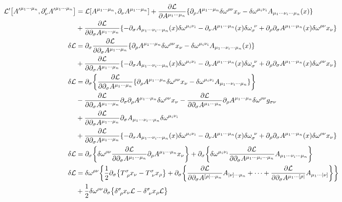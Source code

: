\documentclass[twoside]{amsart}
\numberwithin{equation}{section}
\begin{document}
\begin{align}
    \mathcal L'\qty[{A'}^{\mu_1\cdots\mu_n},\partial_\nu' {A'}^{\mu_1\cdots\mu_n}]&=\mathcal L\qty[A^{\mu_1\cdots\mu_n},\partial_\nu A^{\mu_1\cdots\mu_n}]+\pdv{\mathcal L}{A^{\mu_1\cdots\mu_n}}\qty{\partial_\rho A^{\mu_1\cdots\mu_n}\delta\omega^{\rho\nu}x_\nu-\delta\omega^{\mu_i\nu_i}A_{\mu_1\cdots\nu_i\cdots\mu_n}\qty(x)}\\
    &+\pdv{\mathcal L}{\partial_\sigma A^{\mu_1\cdots\mu_n}}\qty{-\partial_\sigma A_{\mu_1\cdots\nu_i\cdots\mu_n}\qty(x)\delta\omega^{\mu_i\nu_i}-\partial_{\nu} A^{\mu_1\cdots\mu_n}\qty(x)\delta\omega_{\sigma}^{\ \nu}+\partial_\rho\partial_\sigma A^{\mu_1\cdots\mu_n}\qty(x)\delta\omega^{\rho\nu}x_\nu}\\
    \delta\mathcal L&=\partial_\sigma\pdv{\mathcal L}{\partial_\sigma A^{\mu_1\cdots\mu_n}}\qty{\partial_\rho A^{\mu_1\cdots\mu_n}\delta\omega^{\rho\nu}x_\nu-\delta\omega^{\mu_i\nu_i}A_{\mu_1\cdots\nu_i\cdots\mu_n}\qty(x)}\\
    &+\pdv{\mathcal L}{\partial_\sigma A^{\mu_1\cdots\mu_n}}\qty{-\partial_\sigma A_{\mu_1\cdots\nu_i\cdots\mu_n}\qty(x)\delta\omega^{\mu_i\nu_i}-\partial_\nu A^{\mu_1\cdots\mu_n}\qty(x)\delta\omega_{\sigma}^{\ \nu}+\partial_\rho\partial_\sigma A^{\mu_1\cdots\mu_n}\qty(x)\delta\omega^{\rho\nu}x_\nu}\\
    \delta\mathcal L&=\partial_\sigma\qty{\pdv{\mathcal L}{\partial_\sigma A^{\mu_1\cdots\mu_n}}\qty{\partial_\rho A^{\mu_1\cdots\mu_n}\delta\omega^{\rho\nu}x_\nu-\delta\omega^{\mu_i\nu_i}A_{\mu_1\cdots\nu_i\cdots\mu_n}}}\\
    &-\pdv{\mathcal L}{\partial_\sigma A^{\mu_1\cdots\mu_n}}\partial_\sigma\partial_\rho A^{\mu_1\cdots\mu_n}\delta\omega^{\rho\nu}x_\nu-\pdv{\mathcal L}{\partial_\sigma A^{\mu_1\cdots\mu_n}}\partial_\rho A^{\mu_1\cdots\mu_n}\delta\omega^{\rho\nu}g_{\sigma\nu}\\
    &+\pdv{\mathcal L}{\partial_\sigma A^{\mu_1\cdots\mu_n}}\partial_\sigma A_{\mu_1\cdots\nu_i\cdots\mu_n}\delta\omega^{\mu_i\nu_i}\\
    &+\pdv{\mathcal L}{\partial_\sigma A^{\mu_1\cdots\mu_n}}\qty{-\partial_\sigma A_{\mu_1\cdots\nu_i\cdots\mu_n}\qty(x)\delta\omega^{\mu_i\nu_i}-\partial_\nu A^{\mu_1\cdots\mu_n}\qty(x)\delta\omega_{\sigma}^{\ \nu}+\partial_\rho\partial_\sigma A^{\mu_1\cdots\mu_n}\qty(x)\delta\omega^{\rho\nu}x_\nu}\\
    \delta\mathcal L&=\partial_\sigma\qty{\delta\omega^{\rho\nu}\pdv{\mathcal L}{\partial_\sigma A^{\mu_1\cdots\mu_n}}\partial_\rho A^{\mu_1\cdots\mu_n}x_\nu}+\partial_\sigma\qty{\delta\omega^{\mu_i\nu_i}\pdv{\mathcal L}{\partial_\sigma A^{\mu_1\cdots\mu_i\cdots\mu_n}}A_{\mu_1\cdots\nu_i\cdots\mu_n}}\\
    \delta\mathcal L&=\delta\omega^{\rho\nu}\qty{\frac12\partial_\sigma\qty{T^{\sigma}_{\ \rho}x_\nu-T^\sigma_{\ \nu}x_\rho}+\partial_\sigma\qty{\pdv{\mathcal L}{\partial_\sigma A^{[\rho|\cdots\mu_n}}A_{|\nu]\cdots\mu_n}+\cdots+\pdv{\mathcal L}{\partial_\sigma A^{\mu_1\cdots[\rho|}}A_{\mu_1\cdots|\nu]}}}\\
    &+\frac12\delta\omega^{\rho\nu}\partial_\sigma\qty{\delta^\sigma_{\ \rho}x_\nu\mathcal L-\delta^\sigma_{\ \nu}x_\rho\mathcal L}
\end{align}
\end{document}

